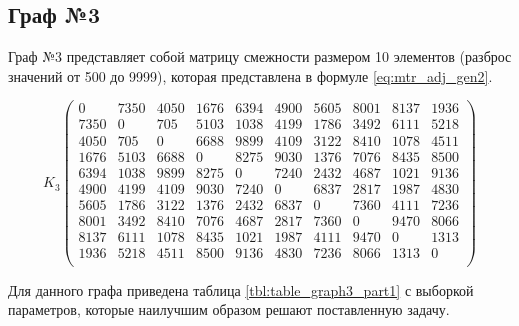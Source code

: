 \subsection{Граф №3}

Граф №3 представляет собой матрицу смежности размером 10 элементов (разброс значений от 500 до 9999), которая представлена в формуле \ref{eq:mtr_adj_gen2}.

\begin{equation}
	\label{eq:mtr_adj_gen2}
	K_3       
	\begin{pmatrix}
		0  & 7350  & 4050  & 1676  & 6394  & 4900  & 5605 &  8001 &  8137 &  1936 \\
		7350  & 0  & 705  & 5103  & 1038  & 4199  &  1786  & 3492  & 6111 &  5218 \\
		4050  & 705  & 0  & 6688  & 9899  &  4109  & 3122  & 8410  & 1078  &  4511 \\
		1676  & 5103  & 6688  & 0 &  8275  & 9030  & 1376  & 7076  & 8435 &  8500 \\
		6394  & 1038  & 9899  & 8275  & 0  & 7240  & 2432  & 4687  & 1021  & 9136 \\
		4900  & 4199  & 4109  & 9030  & 7240  & 0  & 6837  & 2817  & 1987  & 4830 \\
		5605  & 1786  & 3122  & 1376  & 2432  & 6837  & 0  & 7360  & 4111  & 7236 \\
		8001  & 3492  & 8410  & 7076  & 4687  & 2817  & 7360  & 0  & 9470  & 8066 \\
		8137  & 6111  & 1078  & 8435  & 1021  & 1987  & 4111  & 9470  & 0  & 1313 \\
		1936  & 5218  & 4511  & 8500  & 9136  & 4830  & 7236  & 8066  & 1313  & 0 \\
	\end{pmatrix}
\end{equation}

Для данного графа приведена таблица \ref{tbl:table_graph3_part1} с выборкой параметров, которые наилучшим образом решают поставленную задачу. 

\clearpage


